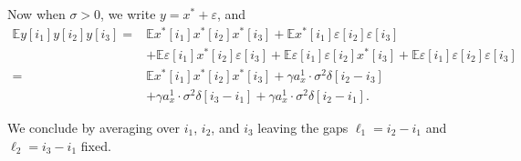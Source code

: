 \documentclass[12pt]{article}
\newcommand{\E}{\mathbb{E}}
\newcommand{\ep}{\varepsilon}
\newcommand{\1}{\mathbf{1}}
\newcommand{\TODO}[1]{{\color{red}{[#1]}}}
\theoremstyle{plain}
\theoremstyle{definition}
\theoremstyle{remark}
\theoremstyle{plain}
\theoremstyle{remark}
\theoremstyle{plain}
\theoremstyle{plain}
\theoremstyle{plain}
\numberwithin{equation}{section}
\begin{document}
Now when $\sigma > 0$, we write $y = x^* + \ep$, and
%
\begin{align}
\E y[i_1] y[i_2] y[i_3] =& \E x^*[i_1] x^*[i_2] x^*[i_3] + \E x^*[i_1] \ep[i_2] \ep[i_3]
\nonumber \\
& + \E\ep[i_1] x^*[i_2] \ep[i_3] + \E \ep[i_1] \ep[i_2] x^*[i_3] 
+ \E \ep[i_1] \ep[i_2]\ep[i_3]
\nonumber \\
=& \E x^*[i_1] x^*[i_2] x^*[i_3] + \gamma  a_x^1 \cdot \sigma^2 \delta[i_2-i_3]
\nonumber \\
& + \gamma a_x^1 \cdot \sigma^2 \delta[i_3-i_1] 
+ \gamma a_x^1 \cdot \sigma^2 \delta[i_2-i_1] .
\end{align}

We conclude by averaging over $i_1$, $i_2$, and $i_3$ leaving the gaps $\ell_1 = i_2 - i_1$ and $\ell_2 = i_3 - i_1$ fixed.
%
%
%
%
%
%
%
%
%
\end{document}
